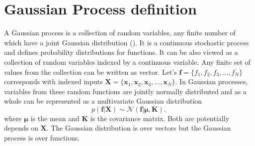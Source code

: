 \section{Gaussian Process definition}
A Gaussian process is a collection of random variables, any finite number of which have a joint Gaussian distribution (\cite{Rasmussen_and_Williams:2006}). It is a continuous stochastic process and defines probability distributions for functions. It can be also viewed as a collection of random variables indexed by a continuous variable. Any finite set of values from the collection can be written as vector. Let's $ \textbf{f} = \{ f_1, f_2, f_3,..., f_N\}$ corresponds with indexed inputs $ \textbf{X} = \{ \textbf{x}_1, \textbf{x}_2, \textbf{x}_3,..., \textbf{x}_N\}$. In Gaussian processes, variables from these random functions are jointly normally distributed and as a whole can be represented as a multivariate Gaussian distribution
\begin{equation} \label{eq:2.2}
p(\textbf{f}|\textbf{X})\sim \mathcal{N}\left(\textbf{f}|\boldsymbol\mu,\textbf{K}\right),
\end{equation}
where $\boldsymbol\mu$ is the mean and $\textbf{K}$ is the covariance matrix. Both are potentially depends on $\textbf{X}$. The Gaussian distribution is over vectors but the Gaussian process is over functions.

